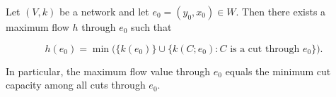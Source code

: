 Let $(V, k)$ be a network and let $e_0 = (y_0, x_0) \in W$. Then there exists a maximum flow $h$ through $e_0$ such that

$$h(e_0) = \min \bigl( \{k(e_0)\} \cup \{k(C; e_0) : C \text{ is a cut through } e_0\} \bigr).$$

In particular, the maximum flow value through $e_0$ equals the minimum cut capacity among all cuts through $e_0$.
